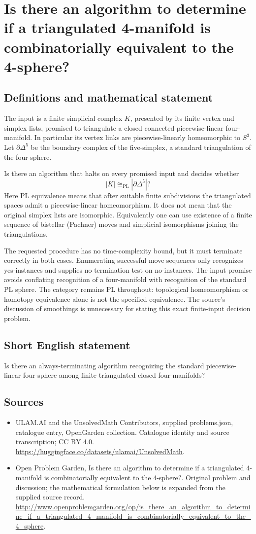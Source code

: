 \documentclass[11pt,a4paper]{article}
\begin{document}
\section*{Is there an algorithm to determine if a triangulated 4-manifold is combinatorially equivalent to the 4-sphere?}\label{statement}

\subsection{Definitions and mathematical statement}
The input is a finite simplicial complex $K$, presented by its finite
vertex and simplex lists, promised to triangulate a closed connected
piecewise-linear four-manifold. In particular its vertex links are
piecewise-linearly homeomorphic to $S^3$. Let $\partial\Delta^5$ be
the boundary complex of the five-simplex, a standard triangulation
of the four-sphere.

Is there an algorithm that halts on every promised input and decides
whether
\[
                         |K|\cong_{\mathrm{PL}}|\partial\Delta^5|?
\]
Here PL equivalence means that after suitable finite subdivisions
the triangulated spaces admit a piecewise-linear homeomorphism.
It does not mean that the original simplex lists are isomorphic.
Equivalently one can use existence of a finite sequence of bistellar
(Pachner) moves and simplicial isomorphisms joining the triangulations.

The requested procedure has no time-complexity bound, but it must
terminate correctly in both cases. Enumerating successful move
sequences only recognizes yes-instances and supplies no termination
test on no-instances. The input promise avoids conflating recognition
of a four-manifold with recognition of the standard PL sphere.
The category remains PL throughout: topological homeomorphism or
homotopy equivalence alone is not the specified equivalence.
The source's discussion of smoothings is unnecessary for stating
this exact finite-input decision problem.
\subsection{Short English statement}
Is there an always-terminating algorithm recognizing the standard piecewise-linear four-sphere among finite triangulated closed four-manifolds?
\subsection{Sources}
\begin{itemize}
\item[S1] ULAM.AI and the UnsolvedMath Contributors, supplied problems.json, catalogue entry, OpenGarden collection. Catalogue identity and source transcription; CC BY 4.0.
\url{https://huggingface.co/datasets/ulamai/UnsolvedMath}.
\item[S2] Open Problem Garden, Is there an algorithm to determine if a triangulated 4-manifold is combinatorially equivalent to the 4-sphere?. Original problem and discussion; the mathematical formulation below is expanded from the supplied source record.
\url{http://www.openproblemgarden.org/op/is_there_an_algorithm_to_determine_if_a_triangulated_4_manifold_is_combinatorially_equivalent_to_the_4_sphere}.
\end{itemize}
\end{document}
